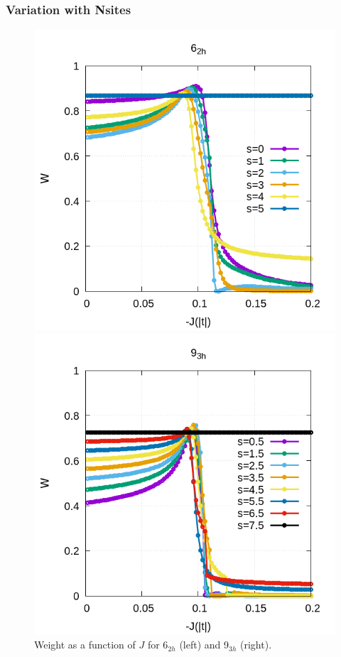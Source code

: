 \documentclass[12pt,twoside]{report}
\begin{document}
	\subsubsection{Variation with Nsites}
	\begin{figure}[ht]
		\centering
		\hspace{-1.5cm}
		\begin{minipage}{0.4\textwidth}
			\includegraphics[scale=0.4]{W_vs_J_sites_2-xrep-0.png}
		\end{minipage}
		\hspace{2cm}
		\begin{minipage}{0.4\textwidth}
			\includegraphics[scale=0.4]{W_vs_J_sites_3-xrep-0.png}
		\end{minipage}
		\caption{\label{fig:} Weight as a function of $J$ for 6$_{2h}$ (left) and 9$_{3h}$ (right). }
	\end{figure}
	
\end{document}
